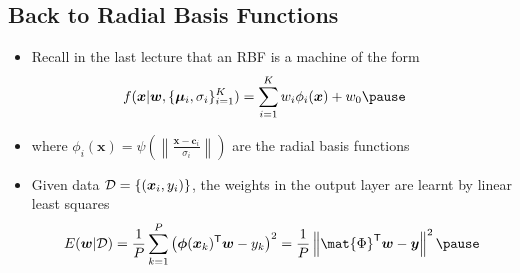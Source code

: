 \begin{slide}
\section[-1]{Back to Radial Basis Functions}

\begin{PauseHighLight}
  \begin{itemize}
  \item Recall in the last lecture that an RBF is a machine of the form
    \begin{align*}
      f(\bm{x}|\bm{w},\{\bm{\mu}_i,\sigma_i\}_{i=1}^K) &=
      \sum_{i=1}^K w_i \phi_i(\bm{x}) + w_0\pause
    \end{align*}
  \item where $\phi_i(\bm{x}) =
    \psi\left(\left\|\frac{\bm{x}-\bm{c}_i}{\sigma_i}\right\|\right)$
    are the radial basis functions\pause
  \item Given data $\mathcal{D}=\{(\bm{x}_i,y_i)\}$, the weights in the output
    layer are learnt by linear least squares
    \begin{displaymath}
      E(\bm{w}|\data) = \frac{1}{P} \sum_{k=1}^P 
      \left( \strut \bm{\phi}(\bm{x}_k)^\tr \bm{w} -y_k \right)^2
      = \frac{1}{P} \left\| \strut \mat{\Phi}^\tr \bm{w} -
        \bm{y}  \right\|^2\pause
    \end{displaymath}
   \end{itemize}
\end{PauseHighLight}

\end{slide}


